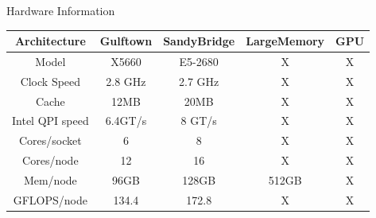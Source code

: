 \documentclass[final,t]{beamer}
\begin{document}
\begin{frame}[fragile]{}
\begin{columns}[t]
\begin{column}{.32\linewidth}
      \begin{block}{Hardware Information}
        \vspace*{-2ex}
      \begin{center}
      \begin{tabular}{|c|c|c|c|c|}
      \hline 
      \textbf{Architecture} & \textbf{Gulftown} & \textbf{SandyBridge} & \textbf{LargeMemory} & \textbf{GPU} \\ 
      \hline 
      Model & X5660 & E5-2680 & X & X \\ 
      \hline 
      Clock Speed & 2.8 GHz & 2.7 GHz & X & X\\ 
      \hline 
      Cache & 12MB & 20MB & X & X\\ 
      \hline 
      Intel QPI speed & 6.4GT/s & 8 GT/s & X & X\\ 
      \hline 
      Cores/socket & 6 & 8 & X & X\\ 
      \hline       
      Cores/node & 12 & 16 & X & X\\ 
      \hline 
      Mem/node & 96GB & 128GB & 512GB & X\\ 
      \hline 
      GFLOPS/node & 134.4 & 172.8 & X & X\\ 
      \hline 
      \end{tabular} 
      \end{center}
        \vspace*{-2ex}
      \end{block}



\end{column}
\end{columns}
\end{frame}
\end{document}
